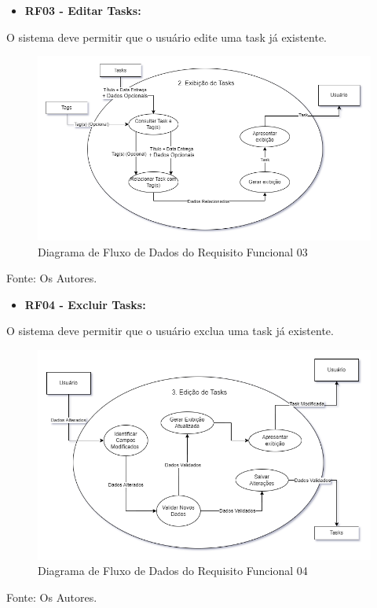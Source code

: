 \documentclass[a4paper,12pt]{article}
\begin{document}
\pagebreak
\begin{itemize}
\item\textbf{RF03 - Editar Tasks:}
\end{itemize}

O sistema deve permitir que o usuário edite uma task já existente.
\begin{figure}[H]
	\centering
	\includegraphics[scale=0.45]{DFDs/RF02.drawio.png}
	\caption{Diagrama de Fluxo de Dados do Requisito Funcional 03}
\end{figure}
\noindent Fonte: Os Autores.

\pagebreak
\begin{itemize}
\item\textbf{RF04 - Excluir Tasks:}
\end{itemize}

O sistema deve permitir que o usuário exclua uma task já existente.
\begin{figure}[H]
	\centering
	\includegraphics[scale=0.45]{DFDs/RF03.drawio.png}
	\caption{Diagrama de Fluxo de Dados do Requisito Funcional 04}
\end{figure}
\noindent Fonte: Os Autores.
\end{document}
